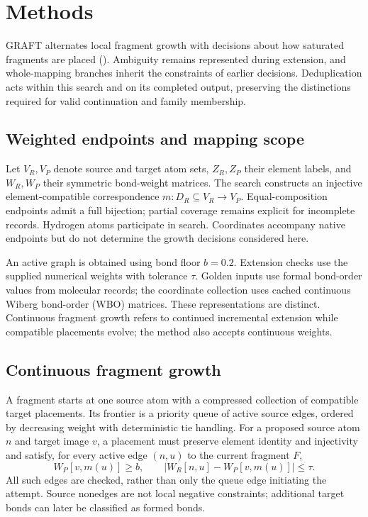 \section{Methods}

GRAFT alternates local fragment growth with decisions about how saturated fragments are placed (). Ambiguity remains represented during extension, and whole-mapping branches inherit the constraints of earlier decisions. Deduplication acts within this search and on its completed output, preserving the distinctions required for valid continuation and family membership.

\subsection{Weighted endpoints and mapping scope}

Let $V_R,V_P$ denote source and target atom sets, $Z_R,Z_P$ their element labels, and $W_R,W_P$ their symmetric bond-weight matrices. The search constructs an injective element-compatible correspondence $m:D_R\subseteq V_R\rightarrow V_P$. Equal-composition endpoints admit a full bijection; partial coverage remains explicit for incomplete records. Hydrogen atoms participate in search. Coordinates accompany native endpoints but do not determine the growth decisions considered here.

An active graph is obtained using bond floor $b=0.2$. Extension checks use the supplied numerical weights with tolerance $\tau$. Golden inputs use formal bond-order values from molecular records; the coordinate collection uses cached continuous Wiberg bond-order (WBO) matrices. These representations are distinct. Continuous fragment growth refers to continued incremental extension while compatible placements evolve; the method also accepts continuous weights.

\subsection{Continuous fragment growth}

A fragment starts at one source atom with a compressed collection of compatible target placements. Its frontier is a priority queue of active source edges, ordered by decreasing weight with deterministic tie handling. For a proposed source atom $n$ and target image $v$, a placement must preserve element identity and injectivity and satisfy, for every active edge $(n,u)$ to the current fragment $F$,
\begin{equation}
W_P[v,m(u)]\geq b,\qquad |W_R[n,u]-W_P[v,m(u)]|\leq\tau.
\label{eq:extension}
\end{equation}
All such edges are checked, rather than only the queue edge initiating the attempt. Source nonedges are not local negative constraints; additional target bonds can later be classified as formed bonds.

